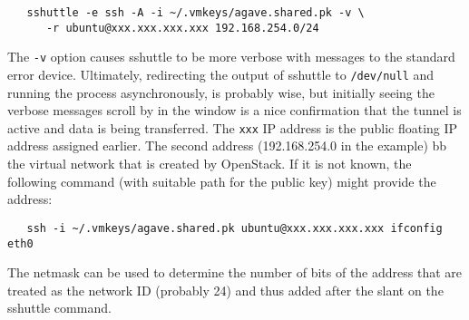 \small\begin{verbatim}
   sshuttle -e ssh -A -i ~/.vmkeys/agave.shared.pk -v \
      -r ubuntu@xxx.xxx.xxx.xxx 192.168.254.0/24
\end{verbatim}\normalsize

\noindent
The \verb!-v! option causes sshuttle to be more verbose with messages to the standard error device.
Ultimately, redirecting the output of sshuttle to \verb!/dev/null! and running the process asynchronously, is probably
wise, but initially seeing the verbose messages scroll by in the window is a nice confirmation that the tunnel is active and data
is being transferred.
The \verb!xxx! IP address is the public floating IP address assigned earlier.  The second address (192.168.254.0 in the example)
bb the virtual network that is created by OpenStack.
If it is not known, the following command (with suitable path for the public key) might provide the address:

\small\begin{verbatim}
   ssh -i ~/.vmkeys/agave.shared.pk ubuntu@xxx.xxx.xxx.xxx ifconfig eth0
\end{verbatim}\normalsize

The netmask can be used to determine the number of bits of the address that are treated as the network ID (probably 24) and thus
added after the slant on the sshuttle command.

\vspace{20 pt}
